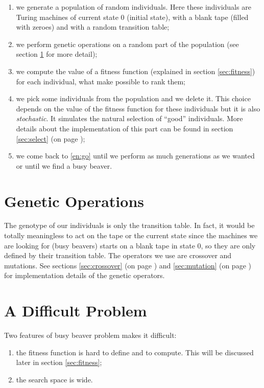 \documentclass{report}
\begin{document}
\begin{enumerate}
\item we generate a population of random individuals. Here these individuals are Turing machines of current state 0 (initial state), with a blank tape (filled with zeroes) and with a random transition table;
\item \label{en:go} we perform genetic operations on a random part of the population (see section \ref{sec:go} for more detail);
\item we compute the value of a fitness function (explained in section \ref{sec:fitness}) for each individual, what make possible to rank them;
\item we pick some individuals from the population and we delete it. This choice depends on the value of the fitness function for these individuals but it is also \textit{stochastic}. It simulates the natural selection of ``good'' individuals. More details about the implementation of this part can be found in section \ref{sec:select} (on page \pageref{sec:select});
\item we come back to \ref{en:go} until we perform as much generations as we wanted or until we find a busy beaver.
\end{enumerate}

\section{Genetic Operations}
\label{sec:go}

The genotype of our individuals is only the transition table. In fact, it would be totally meaningless to act on the tape or the current state since the machines we are looking for (busy beavers) starts on a blank tape in state 0, so they are only defined by their transition table.
The operators we use are crossover and mutations.
See sections \ref{sec:crossover} (on page \pageref{sec:crossover}) and \ref{sec:mutation} (on page \pageref{sec:mutation}) for implementation details of the genetic operators. 

\section{A Difficult Problem}

Two features of busy beaver problem makes it difficult:
\begin{enumerate}
\item the fitness function is hard to define and to compute. This will be discussed later in section \ref{sec:fitness};
\item \label{en:se} the search space is wide.
\end{enumerate}
\end{document}
